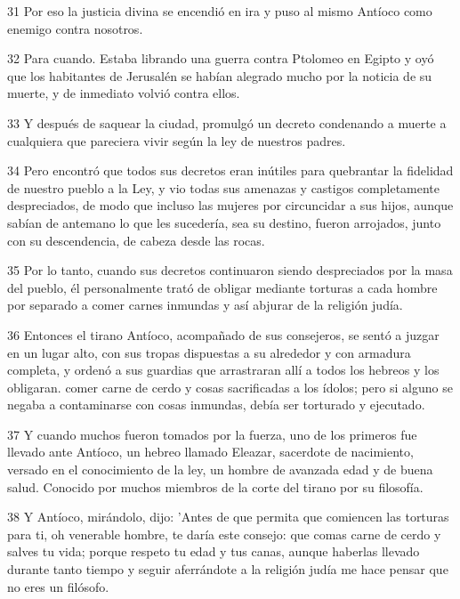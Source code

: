 \par 31 Por eso la justicia divina se encendió en ira y puso al mismo Antíoco como enemigo contra nosotros.

\par 32 Para cuando. Estaba librando una guerra contra Ptolomeo en Egipto y oyó que los habitantes de Jerusalén se habían alegrado mucho por la noticia de su muerte, y de inmediato volvió contra ellos.

\par 33 Y después de saquear la ciudad, promulgó un decreto condenando a muerte a cualquiera que pareciera vivir según la ley de nuestros padres.

\par 34 Pero encontró que todos sus decretos eran inútiles para quebrantar la fidelidad de nuestro pueblo a la Ley, y vio todas sus amenazas y castigos completamente despreciados, de modo que incluso las mujeres por circuncidar a sus hijos, aunque sabían de antemano lo que les sucedería, sea ​​su destino, fueron arrojados, junto con su descendencia, de cabeza desde las rocas.

\par 35 Por lo tanto, cuando sus decretos continuaron siendo despreciados por la masa del pueblo, él personalmente trató de obligar mediante torturas a cada hombre por separado a comer carnes inmundas y así abjurar de la religión judía.

\par 36 Entonces el tirano Antíoco, acompañado de sus consejeros, se sentó a juzgar en un lugar alto, con sus tropas dispuestas a su alrededor y con armadura completa, y ordenó a sus guardias que arrastraran allí a todos los hebreos y los obligaran. comer carne de cerdo y cosas sacrificadas a los ídolos; pero si alguno se negaba a contaminarse con cosas inmundas, debía ser torturado y ejecutado.

\par 37 Y cuando muchos fueron tomados por la fuerza, uno de los primeros fue llevado ante Antíoco, un hebreo llamado Eleazar, sacerdote de nacimiento, versado en el conocimiento de la ley, un hombre de avanzada edad y de buena salud. Conocido por muchos miembros de la corte del tirano por su filosofía.

\par 38 Y Antíoco, mirándolo, dijo: 'Antes de que permita que comiencen las torturas para ti, oh venerable hombre, te daría este consejo: que comas carne de cerdo y salves tu vida; porque respeto tu edad y tus canas, aunque haberlas llevado durante tanto tiempo y seguir aferrándote a la religión judía me hace pensar que no eres un filósofo.

